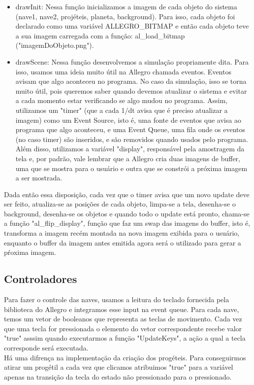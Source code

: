 \documentclass{article}
\begin{document}
\begin{itemize}
  \item drawInit: Nessa função inicializamos a imagem de cada objeto do sistema (nave1, nave2, projéteis, planeta, background). Para isso, cada objeto foi declarado como
uma variável ALLEGRO\_BITMAP e então cada objeto teve a sua imagem carregada com a função: al\_load\_bitmap ("imagemDoObjeto.png").

  \item drawScene: Nessa função desenvolvemos a simulação propriamente dita. Para isso, usamos uma ideia muito útil na Allegro chamada eventos. Eventos avisam
que algo aconteceu no programa. No caso da simulação, isso se torna muito útil, pois queremos saber quando devemos atualizar o sistema e evitar a cada momento
estar verificando se algo mudou no programa. Assim, utilizamos um "timer" (que a cada 1/dt avisa que é preciso atualizar a imagem) como um Event Source, isto é,
uma fonte de eventos que avisa ao programa que algo aconteceu, e uma Event Queue, uma fila onde os eventos (no caso timer) são inseridos, e são removidos quando usados
pelo programa. Além disso, utilizamos a variável "display", responsável pela amostragem da tela e, por padrão, vale lembrar que a Allegro cria duas imagens de buffer,
uma que se mostra para o usuário e outra que se constrói a próxima imagem a ser mostrada.
\end{itemize}
Dada então essa disposição, cada vez que o timer avisa que um novo update deve ser feito, atualiza-se as posições de cada objeto, limpa-se a tela, desenha-se o background,
desenha-se os objetos e quando todo o update está pronto, chama-se a função "al\_flip\_display", função que faz um swap das imagens do buffer, isto é, transforma a imagem
recém montada na nova imagem exibida para o usuário, enquanto o buffer da imagem antes emitida agora será o utilizado para gerar a pŕoxima imagem.

\subsection{Controladores}
Para fazer o controle das naves, usamos a leitura do teclado fornecida pela biblioteca do Allegro e integramos esse input na event queue. Para cada nave, temos um vetor de booleanos que representa as teclas de movimento. Cada vez que uma tecla for pressionada o elemento do vetor correspondente recebe valor "true" asssim quando executarmos a funçäo "UpdateKeys", a açäo a qual a tecla corresponde será executada. \\
Há uma difrença na implementaçäo da criaçäo dos progéteis. Para conseguirmos atirar um progétil a cada vez que clicamos atribuimos "true" para a variável apenas na transição da tecla do estado não pressionado para o pressionado. 
\end{document}

